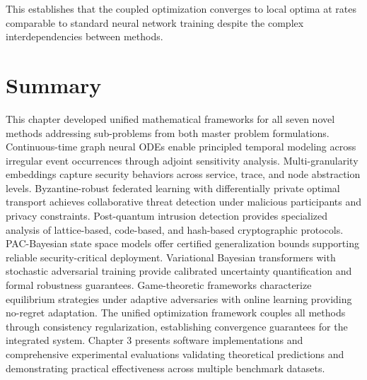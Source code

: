 This establishes that the coupled optimization converges to local optima at rates comparable to standard neural network training despite the complex interdependencies between methods.

\section{Summary}

This chapter developed unified mathematical frameworks for all seven novel methods addressing sub-problems from both master problem formulations. Continuous-time graph neural ODEs enable principled temporal modeling across irregular event occurrences through adjoint sensitivity analysis. Multi-granularity embeddings capture security behaviors across service, trace, and node abstraction levels. Byzantine-robust federated learning with differentially private optimal transport achieves collaborative threat detection under malicious participants and privacy constraints. Post-quantum intrusion detection provides specialized analysis of lattice-based, code-based, and hash-based cryptographic protocols. PAC-Bayesian state space models offer certified generalization bounds supporting reliable security-critical deployment. Variational Bayesian transformers with stochastic adversarial training provide calibrated uncertainty quantification and formal robustness guarantees. Game-theoretic frameworks characterize equilibrium strategies under adaptive adversaries with online learning providing no-regret adaptation. The unified optimization framework couples all methods through consistency regularization, establishing convergence guarantees for the integrated system. Chapter 3 presents software implementations and comprehensive experimental evaluations validating theoretical predictions and demonstrating practical effectiveness across multiple benchmark datasets.
